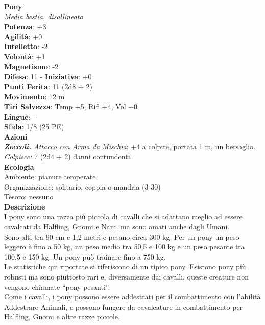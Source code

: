 \begin{multicols}{2}
\medskip\textbf{Pony}\\
\emph{Media bestia, disallineato}\\
\textbf{Potenza}: +3\\
\textbf{Agilità}: +0\\
\textbf{Intelletto}: -2\\
\textbf{Volontà}: +1\\
\textbf{Magnetismo}: -2\\
\textbf{Difesa}: 11 - \textbf{Iniziativa}: +0\\
\textbf{Punti Ferita}: 11 (2d8 + 2)\\
\textbf{Movimento}: 12 m\\
\textbf{Tiri Salvezza}: Temp +5, Rifl +4, Vol +0 \\
\textbf{Lingue}: -\\
\textbf{Sfida}: 1/8 (25 PE)\smallskip\\
\smallskip\textbf{Azioni}\\
\emph{\textbf{Zoccoli.} Attacco con Arma da Mischia}: +4 a colpire, portata 1 m, un bersaglio.\\
\emph{Colpisce:} 7 (2d4 + 2) danni contundenti.\\
\textbf{Ecologia}\\
Ambiente: pianure temperate\\
Organizzazione: solitario, coppia o mandria (3-30)\\
Tesoro: nessuno\\
\textbf{Descrizione}\\

I pony sono una razza più piccola di cavalli che si adattano meglio ad essere cavalcati da Halfling, Gnomi e Nani, ma sono amati anche dagli Umani.\\

Sono alti tra 90 cm e 1,2 metri e pesano circa 300 kg. Per un pony un peso leggero è fino a 50 kg, un peso medio tra 50,5 e 100 kg e un peso pesante tra 100,5 e 150 kg. Un pony può trainare fino a 750 kg.\\

Le statistiche qui riportate si riferiscono di un tipico pony. Esistono pony più robusti  ma sono piuttosto rari e, diversamente dai cavalli, queste creature non vengono chiamate “pony pesanti”.\\

Come i cavalli, i pony possono essere addestrati per il combattimento con l’abilità Addestrare Animali, e possono fungere da cavalcature in combattimento per Halfling, Gnomi e altre razze piccole. \\


\end{multicols}
